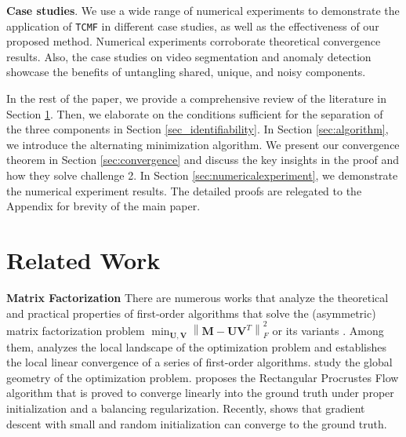 \documentclass[twoside,11pt]{article}
\def\name{\texttt{TCMF}\xspace}
\newcommand{\norm}[1]{\left\lVert#1\right\rVert}
\newcommand{\matM}{\mathbf{M}}
\newcommand{\matU}{\mathbf{U}}
\newcommand{\matV}{\mathbf{V}}
\begin{document}
\textbf{Case studies}. We use a wide range of numerical experiments to demonstrate the application of \name in different case studies, as well as the effectiveness of our proposed method. Numerical experiments corroborate theoretical convergence results. Also, the case studies on video segmentation and anomaly detection showcase the benefits of untangling shared, unique, and noisy components. 

In the rest of the paper, we provide a comprehensive review of the literature in Section \ref{sec:relatedwork}. 
Then, we elaborate on the conditions sufficient for the separation of the three components in Section \ref{sec_identifiability}. In Section \ref{sec:algorithm}, we introduce the alternating minimization algorithm. We present our convergence theorem in Section \ref{sec:convergence} and discuss the key insights in the proof and how they solve challenge 2. In Section \ref{sec:numericalexperiment}, we demonstrate the numerical experiment results. The detailed proofs are relegated to the Appendix for brevity of the main paper.

\section{Related Work}
\label{sec:relatedwork}

\textbf{Matrix Factorization} There are numerous works that analyze the theoretical and practical properties of first-order algorithms that solve the (asymmetric) matrix factorization problem $\min_{\matU,\matV}\norm{{\matM-\matU\matV^T}}_F^2$ or its variants \citep{liglobaloptimization,ye2021global,ruoyuconvergence,parkmatrixsensing,tusensing}. Among them, \citet{ruoyuconvergence} analyzes the local landscape of the optimization problem and establishes the local linear convergence of a series of first-order algorithms. \citet{parkmatrixsensing,nospuriouslocalmin} study the global geometry of the optimization problem. \citet{tusensing} proposes the Rectangular Procrustes Flow algorithm that is proved to converge linearly into the ground truth under proper initialization and a balancing regularization. Recently, \citet{ye2021global} shows that gradient descent with small and random initialization can converge to the ground truth. %
\end{document}
